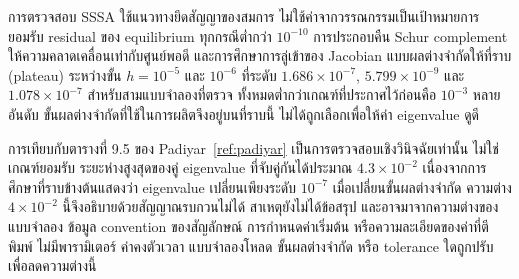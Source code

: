 \documentclass[12pt,a4paper]{article}
\begin{document}
การตรวจสอบ SSSA ใช้แนวทางยึดสัญญาของสมการ ไม่ใช้ค่าจากวรรณกรรมเป็นเป้าหมายการยอมรับ
residual ของ equilibrium ทุกกรณีต่ำกว่า $10^{-10}$ การประกอบคืน Schur complement ให้ความคลาดเคลื่อนเท่ากับศูนย์พอดี และการศึกษาการลู่เข้าของ Jacobian แบบผลต่างจำกัดให้ที่ราบ (plateau) ระหว่างขั้น $h=10^{-5}$ และ $10^{-6}$ ที่ระดับ $1.686\times10^{-7}$, $5.799\times10^{-9}$ และ $1.078\times10^{-7}$ สำหรับสามแบบจำลองที่ตรวจ ทั้งหมดต่ำกว่าเกณฑ์ที่ประกาศไว้ก่อนคือ $10^{-3}$ หลายอันดับ ขั้นผลต่างจำกัดที่ใช้ในการผลิตจึงอยู่บนที่ราบนี้ ไม่ได้ถูกเลือกเพื่อให้ค่า eigenvalue ดูดี

การเทียบกับตารางที่ 9.5 ของ Padiyar~\ref{ref:padiyar} เป็นการตรวจสอบเชิงวินิจฉัยเท่านั้น ไม่ใช่เกณฑ์ยอมรับ ระยะห่างสูงสุดของคู่ eigenvalue ที่จับคู่กันได้ประมาณ $4.3\times10^{-2}$ เนื่องจากการศึกษาที่ราบข้างต้นแสดงว่า eigenvalue เปลี่ยนเพียงระดับ $10^{-7}$ เมื่อเปลี่ยนขั้นผลต่างจำกัด ความต่าง $4\times10^{-2}$ นี้จึงอธิบายด้วยสัญญาณรบกวนไม่ได้ สาเหตุยังไม่ได้ข้อสรุป และอาจมาจากความต่างของแบบจำลอง ข้อมูล convention ของสัญลักษณ์ การกำหนดค่าเริ่มต้น หรือความละเอียดของค่าที่ตีพิมพ์ ไม่มีพารามิเตอร์ ค่าคงตัวเวลา แบบจำลองโหลด ขั้นผลต่างจำกัด หรือ tolerance ใดถูกปรับเพื่อลดความต่างนี้
\end{document}
